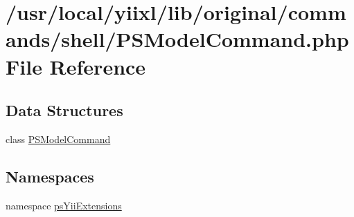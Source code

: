 \hypertarget{PSModelCommand_8php}{
\section{/usr/local/yiixl/lib/original/commands/shell/PSModelCommand.php File Reference}
\label{PSModelCommand_8php}
}
\subsection*{Data Structures}
\begin{DoxyCompactItemize}
\item 
class \hyperlink{classPSModelCommand}{PSModelCommand}
\end{DoxyCompactItemize}
\subsection*{Namespaces}
\begin{DoxyCompactItemize}
\item 
namespace \hyperlink{namespacepsYiiExtensions}{psYiiExtensions}
\end{DoxyCompactItemize}
